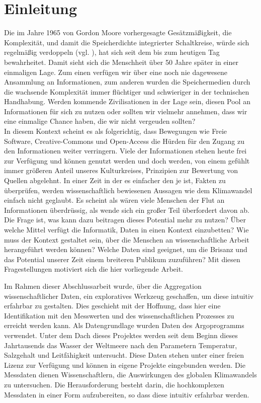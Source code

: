 
\section{Einleitung}


Die im Jahre 1965 von Gordon Moore vorhergesagte Gesätzmäßigkeit, die Komplexität, und damit die Speicherdichte integrierter Schaltkreise, würde sich regelmäßig verdoppeln (vgl. \cite{moore1998cramming}),  hat sich seit dem bis zum heutigen Tag bewahrheitet. Damit sieht sich die Menschheit über 50 Jahre später in einer einmaligen Lage. 
Zum einen verfügen wir über eine noch nie dagewesene Ansammlung an Informationen, zum anderen wurden die Speichermedien durch die wachsende Komplexität immer flüchtiger und schwieriger in der technischen Handhabung. Werden kommende Zivilisationen in der Lage sein, diesen Pool an Informationen für sich zu nutzen oder sollten wir vielmehr annehmen, dass wir eine einmalige Chance haben, die wir nicht vergeuden sollten? \\

In diesem Kontext scheint es als folgerichtig, dass Bewegungen wie Freie Software, Creative-Commons und Open-Access die Hürden für den Zugang zu den Informationen weiter verringern.  Viele der Informationen stehen heute frei zur Verfügung und können genutzt werden und doch werden, von einem gefühlt immer größeren Anteil unseres Kulturkreises, Prinzipien zur Bewertung von Quellen abgelehnt. 
In einer Zeit in der es einfacher den je ist, Fakten zu überprüfen, werden wissenschaftlich bewiesenen Aussagen wie dem Klimawandel einfach nicht geglaubt.
Es scheint als wären viele Menschen der Flut an Informationen überdrüssig, als wende sich ein großer Teil überfordert davon ab.
Die Frage ist, was kann dazu beitragen dieses Potential mehr zu nutzen? 
Über welche Mittel verfügt die Informatik, Daten in einen Kontext einzubetten? Wie muss der Kontext gestaltet sein, über die Menschen an  wissenschaftliche Arbeit herangeführt werden können? Welche Daten sind geeignet, um die Brisanz und das Potential unserer Zeit einem breiteren Publikum zuzuführen? 
Mit diesen Fragestellungen motiviert sich die hier vorliegende Arbeit.

Im Rahmen dieser Abschlussarbeit wurde, über die Aggregation wissenschaftlicher Daten, ein exploratives Werkzeug geschaffen, um diese intuitiv erfahrbar zu gestalten. Dies geschieht mit der Hoffnung, dass hier eine Identifikation mit den Messwerten und des wissenschaftlichen Prozesses zu erreicht werden kann. Als Datengrundlage wurden Daten des Argoprogramms verwendet. Unter dem Dach dieses Projektes werden seit dem Beginn dieses Jahrtausends das Wasser der Weltmeere nach den Parametern Temperatur, Salzgehalt und Leitfähigkeit untersucht. Diese Daten stehen unter einer freien Lizenz zur Verfügung und können in eigene Projekte eingebunden werden.  Die Messdaten dienen Wissenschaftlern, die Auswirkungen des globalen Klimawandels zu untersuchen. Die Herausforderung besteht darin, die  hochkomplexen Messdaten in einer Form aufzubereiten, so dass diese intuitiv erfahrbar werden.\\


